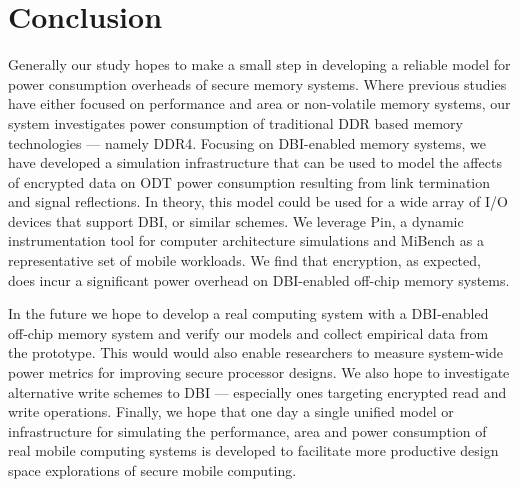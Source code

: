 \section{Conclusion}
\label{sec-conclusions}

Generally our study hopes to make a small step in developing a reliable model
for power consumption overheads of secure memory systems. Where previous
studies have either focused on performance and area or non-volatile memory
systems, our system investigates power consumption of traditional DDR based
memory technologies --- namely DDR4. Focusing on DBI-enabled memory systems, we
have developed a simulation infrastructure that can be used to model the
affects of encrypted data on ODT power consumption resulting from link
termination and signal reflections. In theory, this model could be used for a
wide array of I/O devices that support DBI, or similar schemes. We leverage
Pin, a dynamic instrumentation tool for computer architecture simulations and
MiBench as a representative set of mobile workloads. We find that encryption,
as expected, does incur a significant power overhead on DBI-enabled off-chip
memory systems.

In the future we hope to develop a real computing system with a DBI-enabled
off-chip memory system and verify our models and collect empirical data from
the prototype. This would would also enable researchers to measure system-wide
power metrics for improving secure processor designs. We also hope to
investigate alternative write schemes to DBI --- especially ones targeting
encrypted read and write operations. Finally, we hope that one day a single
unified model or infrastructure for simulating the performance, area and power
consumption of real mobile computing systems is developed to facilitate more
productive design space explorations of secure mobile computing.
